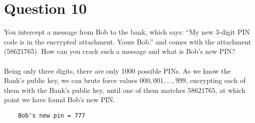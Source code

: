\documentclass[a4paper,12pt]{article}
\begin{document}
\section*{Question 10}
You intercept a message from Bob to the bank, which says: “My new 3-digit PIN code is in the encrypted attachment. Yours Bob.” and comes with the attachment (58621765). How can you crack such a message and what is Bob’s new PIN?\\\\
Being only three digits, there are only 1000 possible PINs. As we know the Bank's public key, we can brute force values $000, 001, ..., 999$, encrypting each of them with the Bank's public key, until one of them matches $58621765$, at which point we have found Bob's new PIN.
\begin{verbatim}
    Bob's new pin = 777
\end{verbatim}
\end{document}
